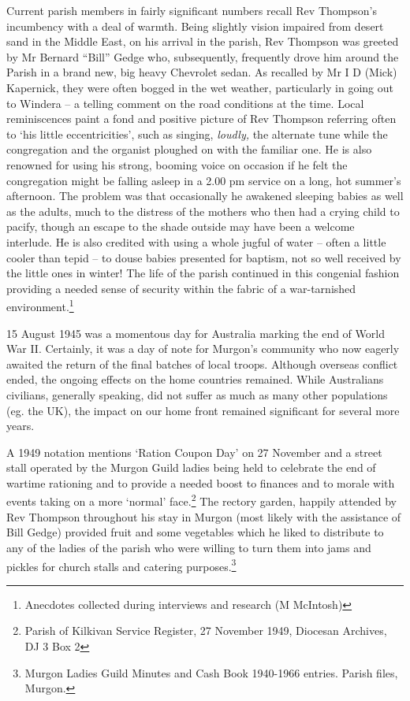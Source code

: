 Current parish members in fairly significant numbers recall Rev Thompson's incumbency with a deal of warmth. Being slightly vision impaired from desert sand in the Middle East, on his arrival in the parish, Rev Thompson was greeted by Mr Bernard ``Bill'' Gedge who, subsequently, frequently drove him around the Parish in a brand new, big heavy Chevrolet sedan. As recalled by Mr I D (Mick) Kapernick, they were often bogged in the wet weather, particularly in going out to Windera -- a telling comment on the road conditions at the time. Local reminiscences paint a fond and positive picture of Rev Thompson referring often to `his little eccentricities', such as singing, \emph{loudly,} the alternate tune while the congregation and the organist ploughed on with the familiar one. He is also renowned for using his strong, booming voice on occasion if he felt the congregation might be falling asleep in a 2.00 pm service on a long, hot summer's afternoon. The problem was that occasionally he awakened sleeping babies as well as the adults, much to the distress of the mothers who then had a crying child to pacify, though an escape to the shade outside may have been a welcome interlude. He is also credited with using a whole jugful of water -- often a little cooler than tepid -- to douse babies presented for baptism, not so well received by the little ones in winter! The life of the parish continued in this congenial fashion providing a needed sense of security within the fabric of a war-tarnished environment.\footnote{Anecdotes collected during interviews and research (M McIntosh)}

15 August 1945 was a momentous day for Australia marking the end of World War II. Certainly, it was a day of note for Murgon's community who now eagerly awaited the return of the final batches of local troops. Although overseas conflict ended, the ongoing effects on the home countries remained. While Australians civilians, generally speaking, did not suffer as much as many other populations (eg. the UK), the impact on our home front remained significant for several more years.

A 1949 notation mentions `Ration Coupon Day' on 27 November and a street stall operated by the Murgon Guild ladies being held to celebrate the end of wartime rationing and to provide a needed boost to finances and to morale with events taking on a more `normal' face.\footnote{Parish of Kilkivan Service Register, 27 November 1949, Diocesan Archives, DJ 3 Box 2} The rectory garden, happily attended by Rev Thompson throughout his stay in Murgon (most likely with the assistance of Bill Gedge) provided fruit and some vegetables which he liked to distribute to any of the ladies of the parish who were willing to turn them into jams and pickles for church stalls and catering purposes.\footnote{Murgon Ladies Guild Minutes and Cash Book 1940-1966 entries. Parish files, Murgon.}

